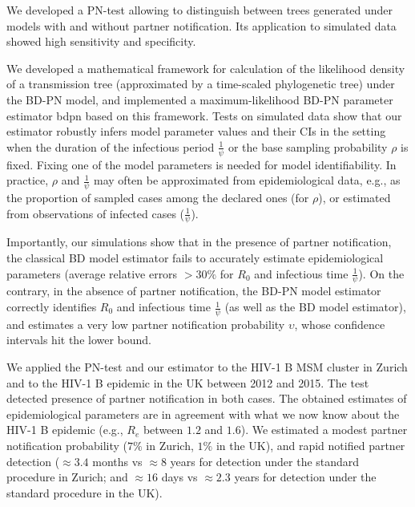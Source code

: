 \documentclass[10pt,letterpaper]{article}
\begin{document}
We developed a PN-test allowing to distinguish between trees generated under models with and without partner notification. Its application to simulated data showed high sensitivity and specificity. 

We developed a mathematical framework for calculation of the likelihood density of a transmission tree (approximated by a time-scaled phylogenetic tree) under the BD-PN model, and implemented a maximum-likelihood BD-PN parameter estimator bdpn based on this framework. %
Tests on simulated data show that our estimator robustly infers model parameter values and their CIs in the setting when the duration of the infectious period $\frac{1}{\psi}$ or the base sampling probability $\rho$ is fixed. Fixing one of the model parameters is needed for model identifiability. In practice, $\rho$ and $\frac{1}{\psi}$ may often be approximated from epidemiological data, e.g., as the proportion of sampled cases among the declared ones (for $\rho$), or estimated from observations of infected cases ($\frac{1}{\psi}$). 

Importantly, our simulations show that in the presence of partner notification, the classical BD model estimator fails to accurately estimate epidemiological parameters (average relative errors $> 30\%$ for $R_0$ and infectious time $\frac{1}{\psi}$). On the contrary, in the absence of partner notification, the BD-PN model estimator correctly identifies $R_0$ and infectious time $\frac{1}{\psi}$ (as well as the BD model estimator), and estimates a very low partner notification probability $\upsilon$, whose confidence intervals hit the lower bound.

We applied the PN-test and our estimator to the HIV-1 B MSM cluster in Zurich and to the HIV-1 B epidemic in the UK between 2012 and 2015. The test detected presence of partner notification in both cases. The obtained estimates of epidemiological parameters are in agreement with what we now know about the HIV-1 B epidemic (e.g., $R_e$ between $1.2$ and $1.6$). We estimated a modest partner notification probability ($7\%$ in Zurich, $1\%$ in the UK), and rapid notified partner detection ($\approx 3.4$ months vs $\approx  8$ years for detection under the standard procedure in Zurich; and $\approx 16$ days vs $\approx 2.3$ years for detection under the standard procedure in the UK).
\end{document}
